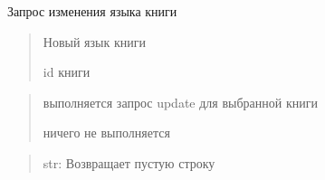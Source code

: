 \documentclass[letterpaper,10pt,russian]{sphinxmanual}
\begin{document}
\begin{fulllineitems}
\label{\detokenize{blueprints:blueprints.change_book_information.change_language}}
\pysigstartsignatures
{}
\pysigstopsignatures
\sphinxAtStartPar
Запрос изменения языка книги
\begin{description}
\begin{quote}\begin{description}
\sphinxAtStartPar
Новый язык книги

\sphinxAtStartPar
id книги

\end{description}\end{quote}

\begin{quote}\begin{description}
\sphinxAtStartPar
выполняется запрос update для выбранной книги

\sphinxAtStartPar
ничего не выполняется

\end{description}\end{quote}

\end{description}
\begin{quote}\begin{description}
\sphinxAtStartPar
str: Возвращает пустую строку

\end{description}\end{quote}

\end{fulllineitems}

\end{document}
